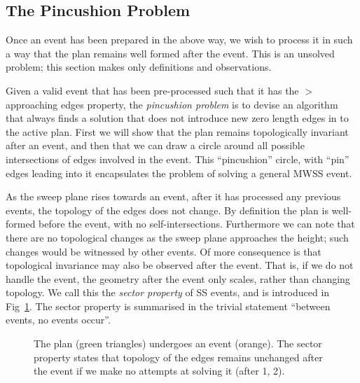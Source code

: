 \FloatBarrier
\subsection{The Pincushion Problem}
\label{sec:pincushion}

Once an event has been prepared in the above way, we wish to process it in such a way that the plan remains well formed after the event. This is an unsolved problem; this section makes only definitions and observations.

Given a valid event that has been pre-processed such that it has the $>$ approaching edges property, the \emph{pincushion problem} is to devise an algorithm that always finds a solution that does not introduce new zero length edges in to the active plan. First we will show that the plan remains topologically invariant after an event, and then that we can draw a circle around all possible intersections of edges involved in the event. This ``pincushion'' circle, with ``pin'' edges leading into it encapsulates the problem of solving a general MWSS event.

As the sweep plane rises towards an event, after it has processed any previous events, the topology of the edges does not change. By definition the plan is well-formed before the event, with no self-intersections. Furthermore we can note that there are no topological changes as the sweep plane approaches the height; such changes would be witnessed by other events. Of more consequence is that topological invariance may also be observed after the event. That is, if we do not handle the event, the geometry after the event only scales, rather than changing topology.
We call this the \emph{sector property} of SS events, and is introduced in Fig~\ref{fig:wss_sector}. The sector property is summarised in the trivial statement ``between events, no events occur''.


\begin{figure}
  \centering
  \def\svgwidth{1.0\columnwidth}
  
  \caption[The sector property]{\label{fig:wss_sector}The plan (green triangles) undergoes an event (orange). The sector property states that topology of the edges remains unchanged after the event if we make no attempts at solving it (after 1, 2).}
\end{figure}

%  


